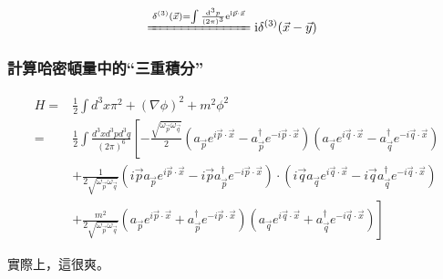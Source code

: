 \documentclass{article}
\begin{document}
$$\begin{aligned}
& \xlongequal{\delta^{(3)}(\vec{x})= \int\frac{\mathrm{d}^3p}{(2\pi)^3}\mathrm{e}^{\mathrm{i}\vec{p}\cdot\vec{x}}} \mathrm{i}\delta^{(3)}(\vec{x}-\vec{y})
\end{aligned}$$

\subsubsection{計算哈密頓量中的“三重積分”}

$$
\begin{aligned}
H= & \frac{1}{2} \int d^{3} x \pi^{2}+(\nabla \phi)^{2}+m^{2} \phi^{2}                                                                                                                                                                                                                                                                          \\
=  & \frac{1}{2} \int \frac{d^{3} x d^{3} p d^{3} q}{(2 \pi)^{6}}\left[-\frac{\sqrt{\omega_{\vec{p}} \omega_{\vec{q}}}}{2}\left(a_{\vec{p}} e^{i \vec{p} \cdot \vec{x}}-a_{\vec{p}}^{\dagger} e^{-i \vec{p} \cdot \vec{x}}\right)\left(a_{\vec{q}} e^{i \vec{q} \cdot \vec{x}}-a_{\vec{q}}^{\dagger} e^{-i \vec{q} \cdot \vec{x}}\right)\right. \\
  & +\frac{1}{2 \sqrt{\omega_{\vec{p}} \omega_{\vec{q}}}}\left(i \vec{p} a_{\vec{p}} e^{i \vec{p} \cdot \vec{x}}-i \vec{p} a_{\vec{p}}^{\dagger} e^{-i \vec{p} \cdot \vec{x}}\right) \cdot\left(i \vec{q} a_{\vec{q}} e^{i \vec{q} \cdot \vec{x}}-i \vec{q} a_{\vec{q}}^{\dagger} e^{-i \vec{q} \cdot \vec{x}}\right)                          \\
& \left.+\frac{m^{2}}{2 \sqrt{\omega_{\vec{p}} \omega_{\vec{q}}}}\left(a_{\vec{p}} e^{i \vec{p} \cdot \vec{x}}+a_{\vec{p}}^{\dagger} e^{-i \vec{p} \cdot \vec{x}}\right)\left(a_{\vec{q}} e^{i \vec{q} \cdot \vec{x}}+a_{\vec{q}}^{\dagger} e^{-i \vec{q} \cdot \vec{x}}\right)\right]
\end{aligned}$$

實際上，這很爽。
\end{document}
